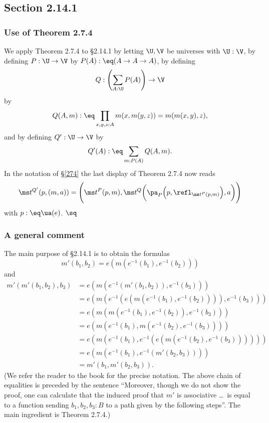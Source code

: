 \documentclass[12pt]{article}
\begin{document}
\subsection{Section 2.14.1}

\subsubsection{Use of Theorem 2.7.4}

We apply Theorem 2.7.4 to \S2.14.1 by letting $\U,\V$ be universes with $\U:\V$, by defining $P:\U\to\V$ by $P(A):\eq(A\to A\to A)$, by defining 
$$
Q:\left(\sum_{A:\U}P(A)\right)\to\V
$$ 
by 
$$
Q(A,m):\eq\prod_{x,y,z:A}m(x,m(y,z))=m(m(x,y),z),
$$ 
and by defining $Q':\U\to\V$ by 
$$ 
Q'(A):\eq\sum_{m:P(A)}Q(A,m).
$$
In the notation of \S\ref{274} the last display of Theorem 2.7.4 now reads 
$$
\ms t^{Q'}(p,(m,a))=\Bigg(\ms t^P(p,m),\ms t^Q\bigg(\pa_P\Big(p,\refl_{\ms t^P(p,m)}\Big),a\bigg)\Bigg)
$$ 
with $p:\eq\ua(e)$. $\sq$

\subsubsection{A general comment}

The main purpose of \S2.14.1 is to obtain the formulas
$$
m'(b_1,b_2)=e(m(e^{-1}(b_1),e^{-1}(b_2)))
$$ 
and
\begin{equation*}
  \begin{aligned}
    m'(m'(b_1,b_2),b_3)
    &= e(m(e^{-1}(m'(b_1,b_2)),e^{-1}(b_3))) \\
    &= e(m(e^{-1}(e(m(e^{-1}(b_1),e^{-1}(b_2)))),e^{-1}(b_3))) \\
    &= e(m(m(e^{-1}(b_1),e^{-1}(b_2)),e^{-1}(b_3))) \\
    &= e(m(e^{-1}(b_1),m(e^{-1}(b_2),e^{-1}(b_3)))) \\
    &= e(m(e^{-1}(b_1),e^{-1}(e(m(e^{-1}(b_2),e^{-1}(b_3)))))) \\
    &= e(m(e^{-1}(b_1),e^{-1}(m'(b_2,b_3)))) \\
    &= m'(b_1,m'(b_2,b_3)).
\end{aligned}
\end{equation*}
(We refer the reader to the book for the precise notation. The above chain of equalities is preceded by the sentence ``Moreover, though we do not show the proof, one can calculate that the induced proof that $m'$ is associative \dots\ is equal to a function sending $b_1,b_2,b_3:B$ to a path given by the following steps''. The main ingredient is Theorem 2.7.4.)
\end{document}
